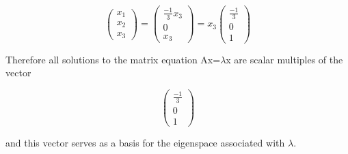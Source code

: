 \documentclass[11pt, oneside]{article}   	%
\begin{document}
 \[
 \begin{pmatrix*}
 x_1\\
 x_2\\
 x_3
 \end{pmatrix*}
 =
 \begin{pmatrix*}
 \frac{-1}{3}x_3\\
 0\\
 x_3
 \end{pmatrix*}
 =
 x_3 \begin{pmatrix*}
 \frac{-1}{3}\\
 0\\
 1
 \end{pmatrix*}
 \]

Therefore all solutions to the matrix equation Ax=$\lambda$x are scalar multiples of the vector

\[
\begin{pmatrix*}
 \frac{-1}{3}\\
 0\\
 1
 \end{pmatrix*}
 \]
 
 and this vector serves as a basis for the eigenspace associated with $\lambda$.

 
\end{document}
